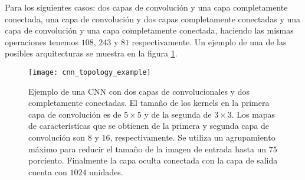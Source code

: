 Para los siguientes casos: dos capas de convolución y una capa completamente conectada, una capa de convolución y dos capas completamente conectadas y
una capa de convolución y una capa completamente conectada, haciendo las
mismas operaciones tenemos $108$, $243$ y $81$ respectivamente.
Un ejemplo de una de las posibles arquitecturas se muestra en la figura \ref{fig:cnn_topo_example}.

\begin{figure}[!ht]
\centering
\caption{Ejemplo de una CNN con dos capas de convolucionales y dos completamente conectadas. El tamaño de los kernels en la primera capa de convolución es de $5 \times 5$ y de la segunda de
$3 \times 3$. Los mapas de características que se obtienen de la primera y segunda capa de convolución son $8$ y $16$, respectivamente. Se utiliza un agrupamiento máximo
para reducir el tamaño de la imagen de entrada hasta un $75$ porciento. Finalmente la capa oculta conectada con la capa de salida cuenta con $1024$ unidades.\label{fig:cnn_topo_example}}
\texttt{[image: cnn\_topology\_example]}
\end{figure}
%

